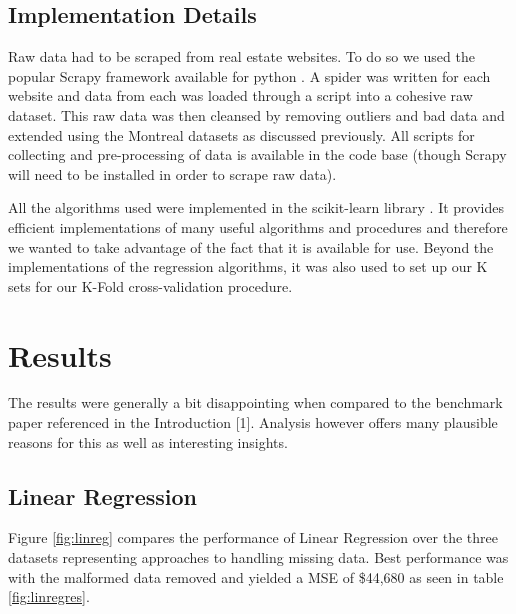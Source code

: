 \documentclass{acm_proc_article-sp}
\begin{document}
\subsection{Implementation Details}
	Raw data had to be scraped from real estate websites. To do so we used the popular Scrapy framework available for python \cite{scrapy}. A spider was written for each website and data from each was loaded through a script into a cohesive raw dataset. This raw data was then cleansed by removing outliers and bad data and extended using the Montreal datasets as discussed previously. All scripts for collecting and pre-processing of data is available in the code base (though Scrapy will need to be installed in order to scrape raw data).
	
	All the algorithms used were implemented in the scikit-learn library \cite{scikit}. It provides efficient implementations of many useful algorithms and procedures and therefore we wanted to take advantage of the fact that it is available for use. Beyond the implementations of the regression algorithms, it was also used to set up our K sets for our K-Fold cross-validation procedure. 

\section{Results}
	 The results were generally a bit disappointing when compared to the benchmark paper referenced in the Introduction [1]. Analysis however offers many plausible reasons for this as well as interesting insights. 
	 
\subsection{Linear Regression}
	Figure \ref{fig:linreg} compares the performance of Linear Regression over the three datasets representing approaches to handling missing data. Best performance was with the malformed data removed and yielded a MSE of \$44,680 as seen in table \ref{fig:linregres}.
\end{document}

